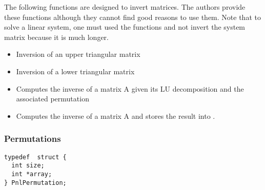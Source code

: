 The following functions are designed to invert matrices. The authors provide
these functions although they cannot find good reasons to use them. Note that
to solve a linear system, one must used the  functions and not
invert the system matrix because it is much longer.
\begin{itemize}
\item {}
  \sshortdescribe Inversion of an upper triangular matrix  

\item {}
  \sshortdescribe Inversion of a lower triangular matrix  

\item {} 
  \sshortdescribe Computes the inverse of a matrix A given its LU
  decomposition and the associated permutation   

\item {}
  \sshortdescribe Computes the inverse of a matrix A and stores the result
  into .
\end{itemize}

\subsubsection{Permutations}

\begin{verbatim}
typedef  struct {
  int size;
  int *array;
} PnlPermutation;
\end{verbatim}

